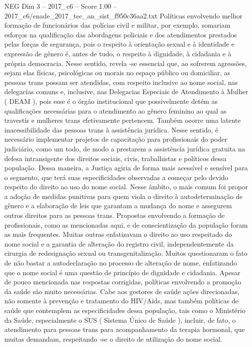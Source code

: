 \begin{textsample}{NEG Dim 3 – 2017\_c6 – Score 1.00 – 2017\_c6/enade\_2017\_tec\_an\_sist\_f950c36aa2.txt}
Políticas envolvendo melhor formação de funcionários das polícias civil e militar, por exemplo, somariam esforços na qualificação das abordagens policiais e dos atendimentos prestados pelas forças de segurança, pois o respeito à orientação sexual e à identidade e expressão de gênero é, antes de tudo, o respeito à dignidade, à cidadania e à própria democracia.
Nesse sentido, revela -se essencial que, ao sofrerem agressões, sejam elas físicas, psicológicas ou morais no espaço público ou domiciliar, as pessoas trans possam ser atendidas, com respeito inclusive ao nome social, nas delegacias comuns e, inclusive, nas Delegacias Especiais de Atendimento à Mulher ( DEAM ), pois esse é o órgão institucional que possivelmente detém as qualificações necessárias para o atendimento ao gênero feminino ao qual as travestis e mulheres trans efetivamente pertencem.
Também ocorre uma latente inacessibilidade das pessoas trans à assistência jurídica.
Nesse sentido, é necessário implementar projetos de capacitação para profissionais do poder judiciário, como um todo, de modo a prestarem a assistência jurídica gratuita na defesa intransigente dos direitos sociais, civis, trabalhistas e políticos dessa população.
Dessa maneira, a Justiça agiria de forma mais acessível e sensível para o segmento, que terá suas especificidades observadas a começar pelo devido respeito do direito ao uso do nome social.
Nesse âmbito, o mais comum foi propor a adoção de medidas punitivas para quem viola o direito à autodeterminação de gênero e a elaboração de leis que garantam a mudança do nome e assegurem outros direitos para as pessoas trans.
Propostas envolvendo a formação de profissionais, como as mencionadas aqui, e de conscientização da população foram as mais frequentes.
Muitas outras enfatizavam o direito ao uso respeitado do nome social e a garantia de alteração do registro civil, independentemente da cirurgia de redesignação sexual ou transgenitalização.
Muitos questionaram o fato de não bastar a autodeclaração no processo de alteração de nome, enfatizando que o nome social é uma questão de princípio de dignidade e cidadania.
Apesar de pouco mencionada nas respostas corrigidas, políticas envolvendo a promoção da saúde são muito necessárias.
Cabe aos gestores de saúde ações direcionadas, não somente à prevenção e tratamento do HIV/Aids, mas também políticas de saúde que contemplem as especificidades dessa população, tais como o Ministério da Saúde, especialmente o SUS ( Sistema Único de Saúde ), incluir, de fato, o atendimento para pessoas trans para acompanhamento da terapia hormonal, que muitas demandam, respeitando -se o direito de utilização do nome social.

\end{textsample}
